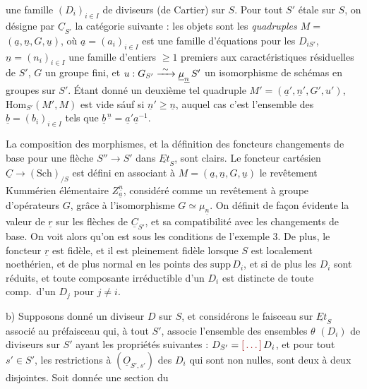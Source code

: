 \documentclass[11pt,a4paper]{article}
\begin{document}
 une famille
$(D_i)_{i \in I}$ de diviseurs (de Cartier) sur $S$. Pour tout $S'$ étale sur
$S$, on désigne par $\underline{C}_{S'}$ la catégorie suivante : les objets
sont les  \emph{quadruples $M = $} $(\underline{a},
\underline{n}, G, \underline{u})$, où $\underline{a} = (a_i)_{i \in I}$ est une
famille d'équations pour les $D_{iS'}$, $\underline{n} = (n_i)_{i \in I}$ une
famille d'entiers $\geqslant 1$ premiers aux caractéristiques résiduelles de
$S'$, \struck{\ill{}} $G$ un groupe fini, et $u : G_{S'} \xrightarrow{\ \sim\ }
\uncertain{\mu}_{\underline{n}}\,S'$ un isomorphisme de schémas en groupes sur
$S'$. Étant donné un deuxième tel quadruple $M' = (\underline{a}',
\underline{n}', G', u')$,  $\mathrm{Hom}_{S'}(M', M)$ est vide sáuf si $\underline{n}' \geqslant
\underline{n}$, auquel cas c'est l'ensemble des $\underline{b} = (b_i)_{i \in I}$
tels que $\underline{b}^{\,\underline{n}} = \underline{a}'\underline{a}^{-1}$.

La composition des morphismes, et la définition des foncteurs changements de
base pour une flèche $S'' \to S'$ dans $\underline{Et}_S$, sont clairs. Le
foncteur cartésien $\underline{C} \to (\mathrm{Sch})_{/S}$ est défini en
associant à $M = (\underline{a}, \underline{n}, G, \underline{u})$ le
revêtement Kummérien élémentaire $Z^{\underline{n}}_{\underline{a}}$,
 considéré comme un revêtement à groupe d'opérateurs $G$,
grâce à l'isomorphisme $G \simeq \mu_{\underline{n}}$. On définit de façon
évidente la valeur de $\underline{r}$ sur les flèches de
$\underline{C}_{S'}$, et sa compatibilité avec les changements de base. On voit
alors qu'on est sous les conditions de l'exemple 3. De plus, le foncteur
$\underline{r}$ est fidèle, et il est pleinement fidèle lorsque $S$ est
 localement noethérien, et de plus normal en
les points des $\mathrm{supp}\,D_i$, et si de plus les $D_i$ sont réduits, et
toute composante irréductible d'un $D_i$ est distincte de toute comp.\ d'un
$D_j$ pour $j \neq i$.

b) Supposons donné un diviseur $D$ sur $S$, \struck{\ill{}} et considérons le
faisceau sur $\underline{Et}_S$ associé au préfaisceau qui, à tout $S'$,
associe l'ensemble des  ensembles $\theta$ \emph{$(D_i)$} de
diviseurs sur $S'$ ayant les propriétés suivantes : $D_{S'} = \ill{}\, D_i$, et
pour tout $s' \in S'$, les restrictions à $(\underline{O}_{S',s'})$
des $D_i$ qui sont non nulles, sont deux à deux disjointes. Soit donnée une
section du
\end{document}
